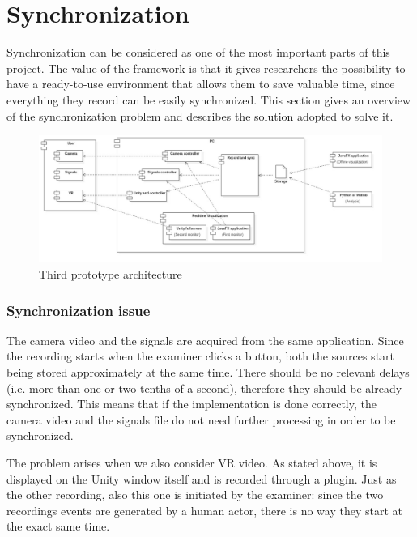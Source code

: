 \documentclass[binding=0.6cm,LaM]{sapthesis}
\begin{document}
\section{Synchronization}
\label{sec:sync}
Synchronization can be considered as one of the most important parts of this project. The value of the framework is that it gives researchers the possibility to have a ready-to-use environment that allows them to save valuable time, since everything they record can be easily synchronized.
This section gives an overview of the synchronization problem and describes the solution adopted to solve it.

\begin{figure}[p]
\centering
\includegraphics[scale=.5, angle=90]{images/prot3_architecture}
\caption{Third prototype architecture}
\end{figure}

\subsubsection{Synchronization issue}

The camera video and the signals are acquired from the same application. Since the recording starts when the examiner clicks a button, both the sources start being stored approximately at the same time. There should be no relevant delays (i.e. more than one or two tenths of a second), therefore they should be already synchronized. This means that if the implementation is done correctly, the camera video and the signals file do not need further processing in order to be synchronized.

The problem arises when we also consider VR video. As stated above, it is displayed on the Unity window itself and is recorded through a plugin. Just as the other recording, also this one is initiated by the examiner: since the two recordings events are generated by a human actor, there is no way they start at the exact same time. 
\end{document}
